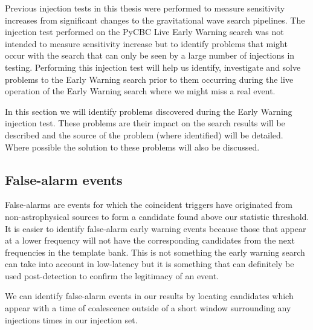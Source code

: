 Previous injection tests in this thesis were performed to measure sensitivity increases from significant changes to the gravitational wave search pipelines. The injection test performed on the PyCBC Live Early Warning search was not intended to measure sensitivity increase but to identify problems that might occur with the search that can only be seen by a large number of injections in testing. Performing this injection test will help us identify, investigate and solve problems to the Early Warning search prior to them occurring during the live operation of the Early Warning search where we might miss a real event.

In this section we will identify problems discovered during the Early Warning injection test. These problems are their impact on the search results will be described and the source of the problem (where identified) will be detailed. Where possible the solution to these problems will also be discussed.

\subsection{\label{6:sec:false-alarms}False-alarm events}

False-alarms are events for which the coincident triggers have originated from non-astrophysical sources to form a candidate found above our statistic threshold. It is easier to identify false-alarm early warning events because those that appear at a lower frequency will not have the corresponding candidates from the next frequencies in the template bank. This is not something the early warning search can take into account in low-latency but it is something that can definitely be used post-detection to confirm the legitimacy of an event.

We can identify false-alarm events in our results by locating candidates which appear with a time of coalescence outside of a short window surrounding any injections times in our injection set.

